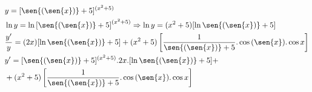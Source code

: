 \begin{ex}
\begin{align}
&y=[\sen{(\sen{x})}+5]^{(x^2+5)}\nonumber\\
&\ln{y}=\ln{[\sen{(\sen{x})}+5]}^{(x^2+5)} \Rightarrow \ln{y}=(x^2+5)[\ln{\sen{(\sen{x})}+5}]\nonumber\\
&\frac{y'}{y}=(2x)[\ln{\sen{(\sen{x})}+5}]+(x^2+5)\left[\frac{1}{\sen{(\sen{x})}+5}.\cos{(\sen{x})}.\cos{x}\right]\nonumber\\
&y'=[\sen{(\sen{x})}+5]^{(x^2+5)}.2x.[\ln{\sen{(\sen{x})}+5}]+\nonumber\\
&+(x^2+5)\left[\frac{1}{\sen{(\sen{x})}+5}.\cos{(\sen{x})}.\cos{x}\right]\nonumber
\end{align}
\end{ex}